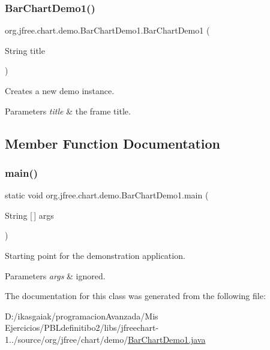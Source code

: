 \subsubsection{\texorpdfstring{Bar\+Chart\+Demo1()}{BarChartDemo1()}}
{\footnotesize\ttfamily org.\+jfree.\+chart.\+demo.\+Bar\+Chart\+Demo1.\+Bar\+Chart\+Demo1 (\begin{DoxyParamCaption}\item[{String}]{title }\end{DoxyParamCaption})}

Creates a new demo instance.


\begin{DoxyParams}{Parameters}
{\em title} & the frame title. \\
\hline
\end{DoxyParams}


\subsection{Member Function Documentation}
\mbox{\label{classorg_1_1jfree_1_1chart_1_1demo_1_1_bar_chart_demo1_a8d88959292e005af1bc56f820f128a65}} 
\subsubsection{\texorpdfstring{main()}{main()}}
{\footnotesize\ttfamily static void org.\+jfree.\+chart.\+demo.\+Bar\+Chart\+Demo1.\+main (\begin{DoxyParamCaption}\item[{String \mbox{[}$\,$\mbox{]}}]{args }\end{DoxyParamCaption})\hspace{0.3cm}{\ttfamily [static]}}

Starting point for the demonstration application.


\begin{DoxyParams}{Parameters}
{\em args} & ignored. \\
\hline
\end{DoxyParams}


The documentation for this class was generated from the following file\+:\begin{DoxyCompactItemize}
\item 
D\+:/ikasgaiak/programacion\+Avanzada/\+Mis Ejercicios/\+P\+B\+Ldefinitibo2/libs/jfreechart-\/1../source/org/jfree/chart/demo/\mbox{\hyperlink{_bar_chart_demo1_8java}{Bar\+Chart\+Demo1.\+java}}\end{DoxyCompactItemize}
